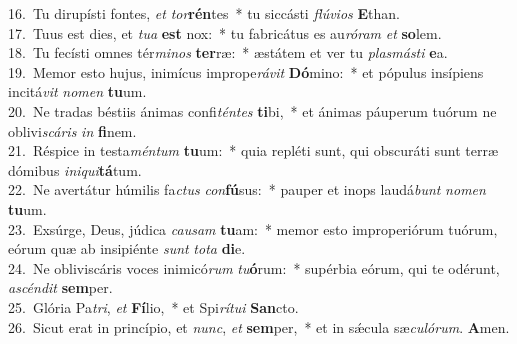 {16.~}Tu dirupísti fontes, \textit{et} \textit{tor}\textbf{rén}tes~* tu siccásti \textit{flú}\textit{vi}\textit{os} \textbf{E}than.\\
{17.~}Tuus est dies, et \textit{tu}\textit{a} \textbf{est} nox:~* tu fabricátus es au\textit{ró}\textit{ram} \textit{et} \textbf{so}lem.\\
{18.~}Tu fecísti omnes tér\textit{mi}\textit{nos} \textbf{ter}ræ:~* æstátem et ver tu \textit{plas}\textit{má}\textit{sti} \textbf{e}a.\\
{19.~}Memor esto hujus, inimícus imprope\textit{rá}\textit{vit} \textbf{Dó}mino:~* et pópulus insípiens incitá\textit{vit} \textit{no}\textit{men} \textbf{tu}um.\\
{20.~}Ne tradas béstiis ánimas confi\textit{tén}\textit{tes} \textbf{ti}bi,~* et ánimas páuperum tuórum ne oblivi\textit{scá}\textit{ris} \textit{in} \textbf{fi}nem.\\
{21.~}Réspice in testa\textit{mén}\textit{tum} \textbf{tu}um:~* quia repléti sunt, qui obscuráti sunt terræ dómibus \textit{i}\textit{ni}\textit{qui}\textbf{tá}tum.\\
{22.~}Ne avertátur húmilis fa\textit{ctus} \textit{con}\textbf{fú}sus:~* pauper et inops laudá\textit{bunt} \textit{no}\textit{men} \textbf{tu}um.\\
{23.~}Exsúrge, Deus, júdica \textit{cau}\textit{sam} \textbf{tu}am:~* memor esto improperiórum tuórum, eórum quæ ab insipiénte \textit{sunt} \textit{to}\textit{ta} \textbf{di}e.\\
{24.~}Ne obliviscáris voces inimicó\textit{rum} \textit{tu}\textbf{ó}rum:~* supérbia eórum, qui te odérunt, \textit{a}\textit{scén}\textit{dit} \textbf{sem}per.\\
{25.~}Glória Pa\textit{tri}, \textit{et} \textbf{Fí}lio,~* et Spi\textit{rí}\textit{tu}\textit{i} \textbf{San}cto.\\
{26.~}Sicut erat in princípio, et \textit{nunc}, \textit{et} \textbf{sem}per,~* et in sǽcula sæ\textit{cu}\textit{ló}\textit{rum}. \textbf{A}men.\\
